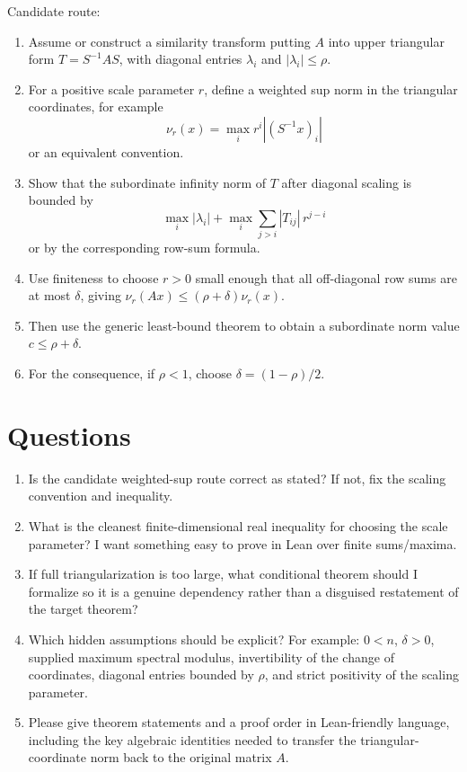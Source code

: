 \documentclass{article}
\begin{document}
Candidate route:
\begin{enumerate}
\item Assume or construct a similarity transform putting \(A\) into upper
  triangular form \(T=S^{-1}AS\), with diagonal entries \(\lambda_i\) and
  \(|\lambda_i|\le\rho\).
\item For a positive scale parameter \(r\), define a weighted sup norm in the
  triangular coordinates, for example
  \[
    \nu_r(x)=\max_i r^i |(S^{-1}x)_i|
  \]
  or an equivalent convention.
\item Show that the subordinate infinity norm of \(T\) after diagonal scaling
  is bounded by
  \[
    \max_i |\lambda_i| + \max_i\sum_{j>i} |T_{ij}|\,r^{j-i}
  \]
  or by the corresponding row-sum formula.
\item Use finiteness to choose \(r>0\) small enough that all off-diagonal row
  sums are at most \(\delta\), giving \(\nu_r(Ax)\le(\rho+\delta)\nu_r(x)\).
\item Then use the generic least-bound theorem to obtain a subordinate norm
  value \(c\le\rho+\delta\).
\item For the consequence, if \(\rho<1\), choose \(\delta=(1-\rho)/2\).
\end{enumerate}

\section*{Questions}

\begin{enumerate}
\item Is the candidate weighted-sup route correct as stated?  If not, fix the
  scaling convention and inequality.
\item What is the cleanest finite-dimensional real inequality for choosing the
  scale parameter?  I want something easy to prove in Lean over finite
  sums/maxima.
\item If full triangularization is too large, what conditional theorem should
  I formalize so it is a genuine dependency rather than a disguised restatement
  of the target theorem?
\item Which hidden assumptions should be explicit?  For example: \(0<n\),
  \(\delta>0\), supplied maximum spectral modulus, invertibility of the change
  of coordinates, diagonal entries bounded by \(\rho\), and strict positivity
  of the scaling parameter.
\item Please give theorem statements and a proof order in Lean-friendly
  language, including the key algebraic identities needed to transfer the
  triangular-coordinate norm back to the original matrix \(A\).
\end{enumerate}
\end{document}
